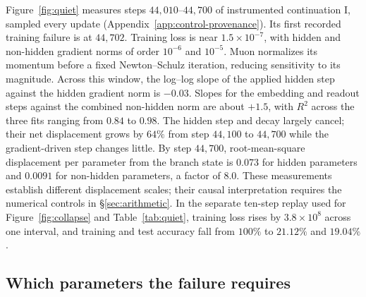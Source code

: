 \documentclass{article}
\begin{document}
Figure~\ref{fig:quiet} measures steps $44{,}010$--$44{,}700$ of instrumented continuation I, sampled every update (Appendix~\ref{app:control-provenance}). Its first recorded training failure is at $44{,}702$. Training loss is near $1.5\times10^{-7}$, with hidden and non-hidden gradient norms of order $10^{-6}$ and $10^{-5}$. Muon normalizes its momentum before a fixed Newton--Schulz iteration, reducing sensitivity to its magnitude. Across this window, the log--log slope of the applied hidden step against the hidden gradient norm is $-0.03$. Slopes for the embedding and readout steps against the combined non-hidden norm are about $+1.5$, with $R^2$ across the three fits ranging from $0.84$ to $0.98$. The hidden step and decay largely cancel; their net displacement grows by $64\%$ from step $44{,}100$ to $44{,}700$ while the gradient-driven step changes little. By step $44{,}700$, root-mean-square displacement per parameter from the branch state is $0.073$ for hidden parameters and $0.0091$ for non-hidden parameters, a factor of $8.0$. These measurements establish different displacement scales; their causal interpretation requires the numerical controls in \S\ref{sec:arithmetic}. In the separate ten-step replay used for Figure~\ref{fig:collapse} and Table~\ref{tab:quiet}, training loss rises by $3.8\times10^{8}$ across one interval, and training and test accuracy fall from $100\%$ to $21.12\%$ and $19.04\%$.

\subsection{Which parameters the failure requires}
\label{sec:branches}
\end{document}

